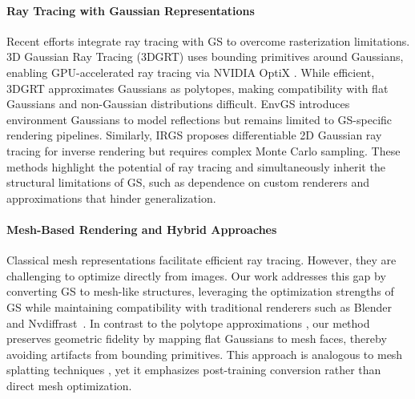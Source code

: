 \paragraph{Ray Tracing with Gaussian Representations}
Recent efforts integrate ray tracing with GS to overcome rasterization limitations. 3D Gaussian Ray Tracing (3DGRT) \cite{moenne20243d} uses bounding primitives around Gaussians, enabling GPU-accelerated ray tracing via NVIDIA OptiX \cite{parker2010optix}. While efficient, 3DGRT approximates Gaussians as polytopes, making compatibility with flat Gaussians \cite{huang20242d} and non-Gaussian distributions difficult. EnvGS \cite{xie2024envgs} introduces environment Gaussians to model reflections but remains limited to GS-specific rendering pipelines. Similarly, IRGS \cite{gu2024irgs} proposes differentiable 2D Gaussian ray tracing for inverse rendering but requires complex Monte Carlo sampling. These methods highlight the potential of ray tracing and simultaneously inherit the structural limitations of GS, such as dependence on custom renderers and approximations that hinder generalization.

\paragraph{Mesh-Based Rendering and Hybrid Approaches}
Classical mesh representations facilitate efficient ray tracing. However, they are challenging to optimize directly from images. Our work addresses this gap by converting GS to mesh-like structures, leveraging the optimization strengths of GS while maintaining compatibility with traditional renderers such as Blender and Nvdiffrast~\cite{munkberg2022extracting}. In contrast to the polytope approximations \cite{moenne20243d}, our method preserves geometric fidelity by mapping flat Gaussians to mesh faces, thereby avoiding artifacts from bounding primitives. This approach is analogous to mesh splatting techniques \cite{weyrich2007hardware}, yet it emphasizes post-training conversion rather than direct mesh optimization.





